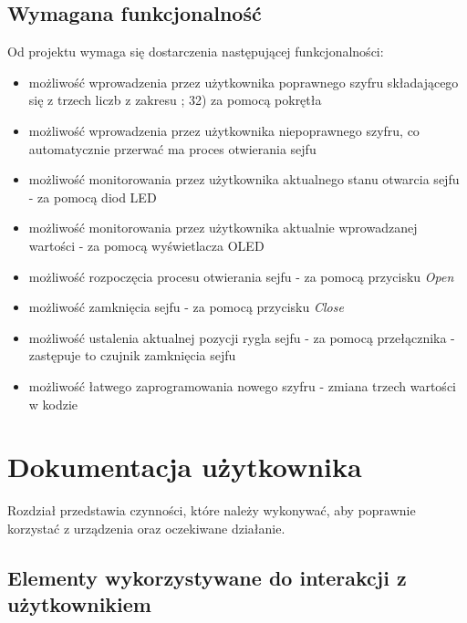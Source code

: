 \documentclass[12pt] {article}
\begin{document}
\subsection{Wymagana funkcjonalność}
Od projektu wymaga się dostarczenia następującej funkcjonalności:
\begin{itemize}
\item możliwość wprowadzenia przez użytkownika poprawnego szyfru składającego się z trzech liczb z zakresu ; 32) za pomocą pokrętła
\item możliwość wprowadzenia przez użytkownika niepoprawnego szyfru, co automatycznie przerwać ma proces otwierania sejfu
\item możliwość monitorowania przez użytkownika aktualnego stanu otwarcia sejfu - za pomocą diod LED
\item możliwość monitorowania przez użytkownika aktualnie wprowadzanej wartości - za pomocą wyświetlacza OLED
\item możliwość rozpoczęcia procesu otwierania sejfu - za pomocą przycisku \textit{Open}
\item możliwość zamknięcia sejfu - za pomocą przycisku \textit{Close}
\item możliwość ustalenia aktualnej pozycji rygla sejfu - za pomocą przełącznika - zastępuje to czujnik zamknięcia sejfu
\item możliwość łatwego zaprogramowania nowego szyfru - zmiana trzech wartości w kodzie 
\end{itemize}



\newpage
\section{Dokumentacja użytkownika}
Rozdział przedstawia czynności, które należy wykonywać, aby poprawnie korzystać z urządzenia oraz oczekiwane działanie.

\subsection{Elementy wykorzystywane do interakcji z użytkownikiem}
\end{document}
